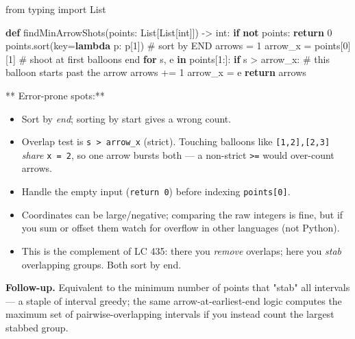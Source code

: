 \documentclass[11pt]{article}
\providecommand{\tightlist}{\setlength{\itemsep}{1pt}\setlength{\parskip}{0pt}}
\newenvironment{Shaded}{\begin{snugshade}}{\end{snugshade}}
\newcommand{\BuiltInTok}[1]{\textcolor[rgb]{0.50,0.55,0.55}{#1}}
\newcommand{\CommentTok}[1]{\textcolor[rgb]{0.48,0.49,0.49}{#1}}
\newcommand{\ControlFlowTok}[1]{\textcolor[rgb]{0.99,0.74,0.29}{\textbf{#1}}}
\newcommand{\DecValTok}[1]{\textcolor[rgb]{0.96,0.45,0.00}{#1}}
\newcommand{\ImportTok}[1]{\textcolor[rgb]{0.15,0.68,0.38}{#1}}
\newcommand{\KeywordTok}[1]{\textcolor[rgb]{0.81,0.81,0.76}{\textbf{#1}}}
\newcommand{\NormalTok}[1]{\textcolor[rgb]{0.81,0.81,0.76}{#1}}
\newcommand{\OperatorTok}[1]{\textcolor[rgb]{0.81,0.81,0.76}{#1}}
\newcommand{\RegionMarkerTok}[1]{\textcolor[rgb]{0.16,0.50,0.73}{\colorbox[rgb]{0.08,0.19,0.26}{#1}}}
\begin{document}
\begin{Shaded}
\begin{Highlighting}[]
\ImportTok{from}\NormalTok{ typing }\ImportTok{import}\NormalTok{ List}

\KeywordTok{def}\NormalTok{ findMinArrowShots(points: List[List[}\BuiltInTok{int}\NormalTok{]]) }\OperatorTok{{-}\textgreater{}} \BuiltInTok{int}\NormalTok{:}
    \ControlFlowTok{if} \KeywordTok{not}\NormalTok{ points:}
        \ControlFlowTok{return} \DecValTok{0}
\NormalTok{    points.sort(key}\OperatorTok{=}\KeywordTok{lambda}\NormalTok{ p: p[}\DecValTok{1}\NormalTok{])          }\CommentTok{\# sort by }\RegionMarkerTok{END}
\NormalTok{    arrows }\OperatorTok{=} \DecValTok{1}
\NormalTok{    arrow\_x }\OperatorTok{=}\NormalTok{ points[}\DecValTok{0}\NormalTok{][}\DecValTok{1}\NormalTok{]                    }\CommentTok{\# shoot at first balloon\textquotesingle{}s end}
    \ControlFlowTok{for}\NormalTok{ s, e }\KeywordTok{in}\NormalTok{ points[}\DecValTok{1}\NormalTok{:]:}
        \ControlFlowTok{if}\NormalTok{ s }\OperatorTok{\textgreater{}}\NormalTok{ arrow\_x:                      }\CommentTok{\# this balloon starts past the arrow}
\NormalTok{            arrows }\OperatorTok{+=} \DecValTok{1}
\NormalTok{            arrow\_x }\OperatorTok{=}\NormalTok{ e}
    \ControlFlowTok{return}\NormalTok{ arrows}
\end{Highlighting}
\end{Shaded}

** Error-prone spots:**

\begin{itemize}
\tightlist
\item
  Sort by \emph{end}; sorting by start gives a wrong count.
\item
  Overlap test is \texttt{s\ \textgreater{}\ arrow\_x} (strict). Touching balloons like \texttt{{[}1,2{]},{[}2,3{]}} \emph{share} \texttt{x\ =\ 2}, so one arrow bursts both --- a non-strict \texttt{\textgreater{}=} would over-count arrows.
\item
  Handle the empty input (\texttt{return\ 0}) before indexing \texttt{points{[}0{]}}.
\item
  Coordinates can be large/negative; comparing the raw integers is fine, but if you sum or offset them watch for overflow in other languages (not Python).
\item
  This is the complement of LC 435: there you \emph{remove} overlaps; here you \emph{stab} overlapping groups. Both sort by end.
\end{itemize}

\textbf{Follow-up.} Equivalent to the minimum number of points that "stab" all intervals --- a staple of interval greedy; the same arrow-at-earliest-end logic computes the maximum set of pairwise-overlapping intervals if you instead count the largest stabbed group.
\end{document}
